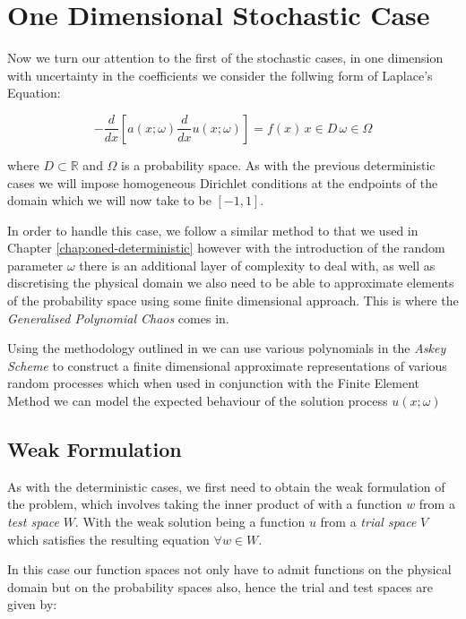 \chapter{One Dimensional Stochastic Case}\label{chap:oned-stochastic}

Now we turn our attention to the first of the stochastic cases, in one
dimension with uncertainty in the coefficients we consider the follwing form
of Laplace's Equation:

\begin{equation}\label{eq:oned-stochastic}
      -\frac{d}{dx}\left[a(x;\omega)\frac{d}{dx}u(x;\omega)\right] = f(x)\,
                              x \in  D \, \omega \in \Omega
\end{equation}

where $D \subset \mathbb{R}$ and $\Omega$ is a probability space. As with the
previous deterministic cases we will impose homogeneous Dirichlet conditions at
the endpoints of the domain which we will now take to be $[-1, 1]$.

In order to handle this case, we follow a similar method to that we used in
Chapter \ref{chap:oned-deterministic} however with the introduction of the
random parameter $\omega$ there is an additional layer of complexity to deal
with, as well as discretising the physical domain we also need to be able to
approximate elements of the probability space using some finite dimensional
approach.  This is where the \textit{Generalised Polynomial Chaos} comes in.

Using the methodology outlined in \cite{general-poly-chaos} we can use various
polynomials in the \textit{Askey Scheme} to construct a finite dimensional
approximate representations of various random processes which when used in
conjunction with the Finite Element Method we can model the expected behaviour
of the solution process $u(x;\omega)$

\section{Weak Formulation}

As with the deterministic cases, we first need to obtain the weak formulation
of the problem, which involves taking the inner product of
 with a function $w$ from a \textit{test space} $W$.
With the weak solution being a function $u$ from a \textit{trial space} $V$
which satisfies the resulting equation $\forall w \in W$.

In this case our function spaces not only have to admit functions on the
physical domain but on the probability spaces also, hence the trial and test
spaces are given by:

